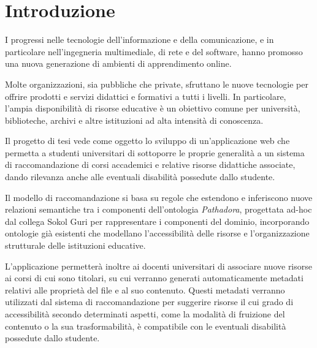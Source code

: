 %
\chapter*{Introduzione}                 %

I progressi nelle tecnologie dell'informazione e della comunicazione, e in particolare nell'ingegneria multimediale, di rete e del software, hanno promosso una nuova generazione di ambienti di apprendimento online.

Molte organizzazioni, sia pubbliche che private, sfruttano le nuove tecnologie per offrire prodotti e servizi didattici e formativi a tutti i livelli. In particolare, l'ampia disponibilità di risorse educative è un obiettivo comune per università, biblioteche, archivi e altre istituzioni ad alta intensità di conoscenza.

\vspace{5mm}

Il progetto di tesi vede come oggetto lo sviluppo di un'applicazione web che permetta a studenti universitari di sottoporre le proprie generalità a un sistema di raccomandazione di corsi accademici e relative risorse didattiche associate, dando rilevanza anche alle eventuali disabilità possedute dallo studente.

Il modello di raccomandazione si basa su regole che estendono e inferiscono nuove relazioni semantiche tra i componenti dell'ontologia \textit{Pathadora}, progettata ad-hoc dal collega Sokol Guri per rappresentare i componenti del dominio, incorporando ontologie già esistenti che modellano l'accessibilità delle risorse e l’organizzazione strutturale delle istituzioni educative. 

\vspace{5mm}

L'applicazione permetterà inoltre ai docenti universitari di associare nuove risorse ai corsi di cui sono titolari, su cui verranno generati automaticamente metadati relativi alle proprietà del file e al suo contenuto. Questi metadati verranno utilizzati dal sistema di raccomandazione per suggerire risorse il cui grado di accessibilità secondo determinati aspetti, come la modalità di fruizione del contenuto o la sua trasformabilità, è compatibile con le eventuali disabilità possedute dallo studente.

